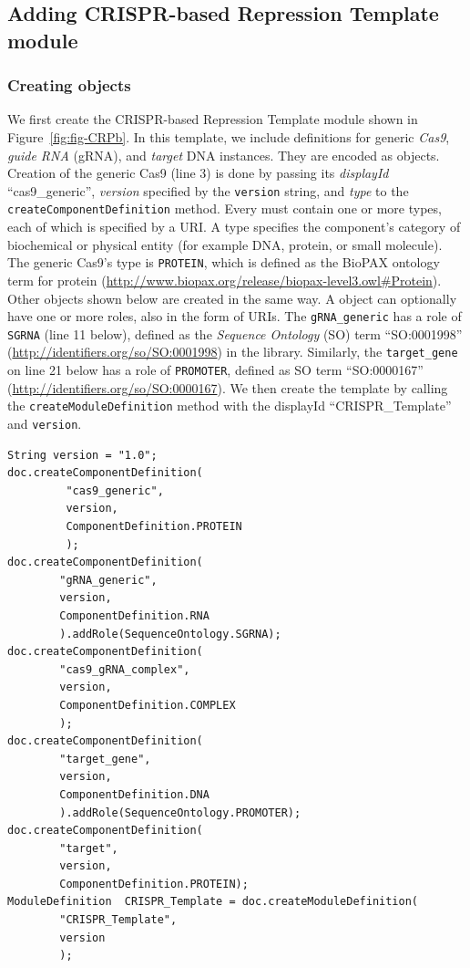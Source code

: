 \subsection*{Adding CRISPR-based Repression Template module}
\subsubsection*{Creating  objects}
We first create the CRISPR-based Repression Template module shown in
Figure~\ref{fig:fig-CRPb}. In this template, we include definitions
for generic \emph{Cas9}, \emph{guide RNA} (gRNA), and \emph{target}
DNA  instances. They are encoded as
 objects. Creation of the generic Cas9 (line
3)  is done by passing its \emph{displayId}
``cas9\_generic'', \emph{version} specified by the \lstinline+version+
string, and \emph{type} to the \lstinline+createComponentDefinition+
method. Every  must contain one or more
types, each of which is specified by a URI. A type specifies the
component's category of biochemical or physical entity (for example
DNA, protein, or small molecule). The generic Cas9's type is
\lstinline+PROTEIN+, which is defined as the BioPAX ontology term for
protein
(\url{http://www.biopax.org/release/biopax-level3.owl\#Protein}). Other
 objects shown below are created in the same
way. A  object can optionally have one or
more roles, also in the form of URIs. The \lstinline+gRNA_generic+ has
a role of \lstinline+SGRNA+ (line 11 below), defined as the
\emph{Sequence Ontology} (SO) term ``SO:0001998''
(\url{http://identifiers.org/so/SO:0001998}) in the
library. Similarly, the \lstinline+target_gene+ on line 21 below has a role of
\lstinline+PROMOTER+, defined as SO term ``SO:0000167''
(\url{http://identifiers.org/so/SO:0000167}). We then create the  template by calling the \lstinline+createModuleDefinition+ method with the displayId ``CRISPR\_Template'' and \lstinline+version+. 

\vspace{\abovedisplayskip}
\begin{minipage}{0.95\textwidth} 
\begin{lstlisting}
String version = "1.0";
doc.createComponentDefinition(
         "cas9_generic", 
         version, 
         ComponentDefinition.PROTEIN
         );
doc.createComponentDefinition(
        "gRNA_generic",
        version, 
        ComponentDefinition.RNA
        ).addRole(SequenceOntology.SGRNA);
doc.createComponentDefinition(
        "cas9_gRNA_complex",
        version, 
        ComponentDefinition.COMPLEX
        );
doc.createComponentDefinition(
        "target_gene",
        version, 
        ComponentDefinition.DNA
        ).addRole(SequenceOntology.PROMOTER);
doc.createComponentDefinition(
        "target",
        version, 
        ComponentDefinition.PROTEIN);
ModuleDefinition  CRISPR_Template = doc.createModuleDefinition(
        "CRISPR_Template", 
        version
        );
\end{lstlisting}
\end{minipage}

